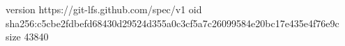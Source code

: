 version https://git-lfs.github.com/spec/v1
oid sha256:c5cbe2fdbefd68430d29524d355a0c3cf5a7c26099584e20bc17e435e4f76e9c
size 43840
